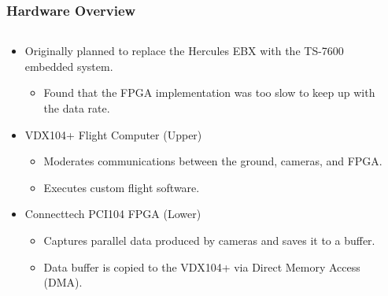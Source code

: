 \documentclass[landscape,xcolor={table},10pt]{beamer}
\begin{document}
	\begin{frame}
		
		\frametitle{Hardware Overview}
		
		\begin{columns}[T] %
		\begin{column}{.68\textwidth}

			\begin{itemize}
				\item Originally planned to replace the Hercules EBX with the TS-7600 embedded system.
				\begin{itemize}
					\item Found that the FPGA implementation was too slow to keep up with the data rate.
				\end{itemize}
				\item VDX104+ Flight Computer (Upper)
				\begin{itemize}
					\item Moderates communications between the ground, cameras, and FPGA.
					\item Executes custom flight software.
				\end{itemize}
				\item Connecttech PCI104 FPGA (Lower)
				\begin{itemize}
					\item Captures parallel data produced by cameras and saves it to a buffer.
					\item Data buffer is copied to the VDX104+ via Direct Memory Access (DMA).
				\end{itemize}
					
			\end{itemize}
		
		\end{column}%
		\hfill%
		\begin{column}{.30\textwidth}


\end{column}
\end{columns}
\end{frame}
\end{document}
